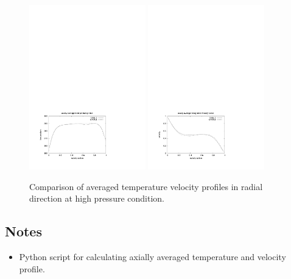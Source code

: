\begin{figure}[htbp]
\begin{center}
\includegraphics[width=0.45\textwidth,viewport=41 46 411 298,clip=true]{../3D/taylor-couette/temperature-high.pdf}
\includegraphics[width=0.45\textwidth,viewport=41 50 407 303,clip=true]{../3D/taylor-couette/velocity-high.pdf}
\end{center}
\caption{Comparison of averaged temperature velocity profiles in radial direction at high pressure condition.}
\label{tch-fig}
\end{figure}


\subsection{Notes}
\begin{itemize}
\item Python script for calculating axially averaged temperature and velocity profile.
      
\end{itemize}
